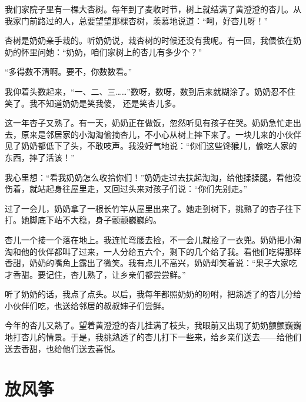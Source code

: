 \documentclass[12pt,UTF-8,openany]{ctexbook}
\begin{document}
\begin{large}
    
    我们家院子里有一棵大杏树。每年到了麦收时节，树上就结满了黄澄澄的杏儿。从我家门前路过的人，总要望望那棵杏树，羡慕地说道：“呵，好杏儿呀！”
    
    杏树是奶奶亲手栽的。听奶奶说，栽杏树的时候还没有我呢。有一回，我偎依在奶奶的怀里问她：“奶奶，咱们家树上的杏儿有多少个？”
    
    “多得数不清啊。要不，你数数看。”
    
    我仰着头数起来，“一、二、三……”数呀，数呀，数到后来就糊涂了。奶奶忍不住笑了。我不知道奶奶是笑我傻， 还是笑杏儿多。
    
    这一年杏子又熟了。有一天，奶奶正在做饭，忽然听见有孩子在哭。奶奶急忙走出去，原来是邻居家的小淘淘偷摘杏儿，不小心从树上摔下来了。一块儿来的小伙伴见了奶奶都低下了头，不敢吱声。我没好气地说：“你们这些馋猴儿，偷吃人家的东西，摔了活该！”
    
    我心里想：“看我奶奶怎么收拾你们！”奶奶走过去扶起淘淘，给他揉揉腿，看他没伤着，就站起身往屋里走，又回过头来对孩子们说：“你们先别走。”
    
    过了一会儿，奶奶拿了一根长竹竿从屋里出来了。她走到树下，挑熟了的杏子往下打。她脚底下站不大稳，身子颤颤巍巍的。
    
    杏儿一个接一个落在地上。我连忙弯腰去捡，不一会儿就捡了一衣兜。奶奶把小淘淘和他的伙伴都叫了过来，一人分给五六个，剩下的几个给了我。看他们吃得那样香甜，奶奶的嘴角上露出了微笑。我有点儿不高兴，奶奶却笑着说：“果子大家吃才香甜。要记住，杏儿熟了，让乡亲们都尝尝鲜。''
    
    听了奶奶的话，我点了点头。以后，我每年都照奶奶的吩咐，把熟透了的杏儿分给小伙伴们吃，也送给邻居的叔叔婶子们尝鲜。
    
    今年的杏儿又熟了。望着黄澄澄的杏儿挂满了枝头，我眼前又出现了奶奶颤颤巍巍地打杏儿的情景。于是，我挑熟透了的杏儿打下一些来，给乡亲们送去——给他们送去香甜，也给他们送去喜悦。
    
\end{large}



\chapter{放风筝}
\end{document}
